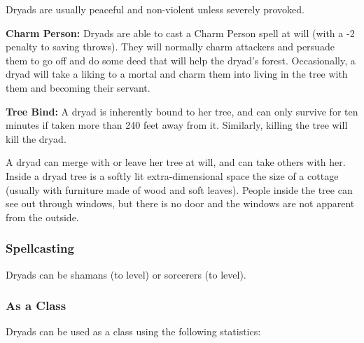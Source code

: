\begin{multicols*}{2}
Dryads are usually peaceful and non-violent unless severely provoked.

\textbf{Charm Person:} Dryads are able to cast a Charm Person spell at will (with a -2 penalty to saving throws). They will normally charm attackers and persuade them to go off and do some deed that will help the dryad’s forest. Occasionally, a dryad will take a liking to a mortal and charm them into living in the tree with them and becoming their servant.

\textbf{Tree Bind:} A dryad is inherently bound to her tree, and can only survive for ten minutes if taken more than 240 feet away from it. Similarly, killing the tree will kill the dryad.

A dryad can merge with or leave her tree at will, and can take others with her. Inside a dryad tree is a softly lit extra-dimensional space the size of a cottage (usually with furniture made of wood and soft leaves). People inside the tree can see out through windows, but there is no door and the windows are not apparent from the outside.

\subsubsection{Spellcasting}
Dryads can be shamans (to  level) or sorcerers (to  level).

\subsubsection{As a Class}
Dryads can be used as a class using the following statistics:



\end{multicols*}
